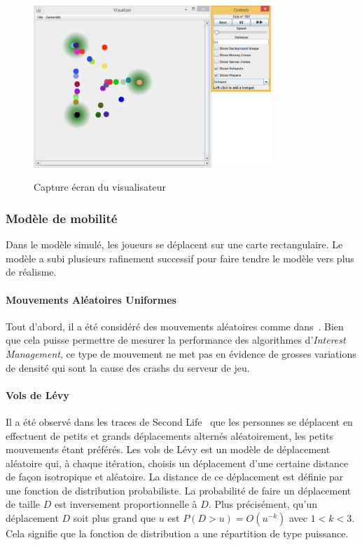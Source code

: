 \begin{figure}[h!]
	\centering
	\includegraphics[width=0.8\textwidth]{capture_ecran.png}
	\\[0.2cm]
	\caption{Capture écran du visualisateur}
	\label{fig:screenshot_visualizer}
\end{figure}

\subsubsection{Modèle de mobilité}

Dans le modèle simulé, les joueurs se déplacent sur une carte rectangulaire.
Le modèle a subi plusieurs rafinement successif pour faire tendre le modèle vers plus de réalisme.

\paragraph{Mouvements Aléatoires Uniformes\\}
Tout d'abord, il a été considéré des mouvements aléatoires comme dans~\cite{interest_management_algorithm}.
Bien que cela puisse permettre de mesurer la performance des algorithmes d'\textit{Interest Management}, ce type de mouvement ne met pas en évidence de grosses variations de densité qui sont la cause des crashs du serveur de jeu.

\paragraph{Vols de Lévy\\}
Il a été observé dans les traces de Second Life~\cite{blue_banana} que les personnes se déplacent en effectuent de petits et grands déplacements alternés aléatoirement, les petits mouvements étant préférés.
Les vols de Lévy est un modèle de déplacement aléatoire qui, à chaque itération, choisis un déplacement d'une certaine distance de façon isotropique et aléatoire.
La distance de ce déplacement est définie par une fonction de distribution probabiliste.
La probabilité de faire un déplacement de taille $D$ est inversement proportionnelle à $D$.
Plus précisément, qu'un déplacement $D$ soit plus grand que $u$ est $P(D>u)=O(u^{-k})$ avec $1<k<3$.
Cela signifie que la fonction de distribution a une répartition de type puissance.

